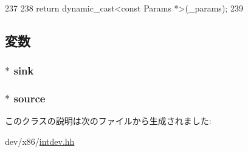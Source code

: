 \begin{DoxyCode}
237     {
238         return dynamic_cast<const Params *>(_params);
239     }
\end{DoxyCode}


\subsection{変数}
\hypertarget{classX86ISA_1_1IntLine_aa415165ed2f6904baf81281b36029451}{
\subsubsection[{sink}]{$\ast$ {\bf sink}}}
\label{classX86ISA_1_1IntLine_aa415165ed2f6904baf81281b36029451}
\hypertarget{classX86ISA_1_1IntLine_a4fd3227605fc7dd8a6a2bfa8c932d895}{
\subsubsection[{source}]{$\ast$ {\bf source}}}
\label{classX86ISA_1_1IntLine_a4fd3227605fc7dd8a6a2bfa8c932d895}


このクラスの説明は次のファイルから生成されました:\begin{DoxyCompactItemize}
\item 
dev/x86/\hyperlink{intdev_8hh}{intdev.hh}\end{DoxyCompactItemize}
